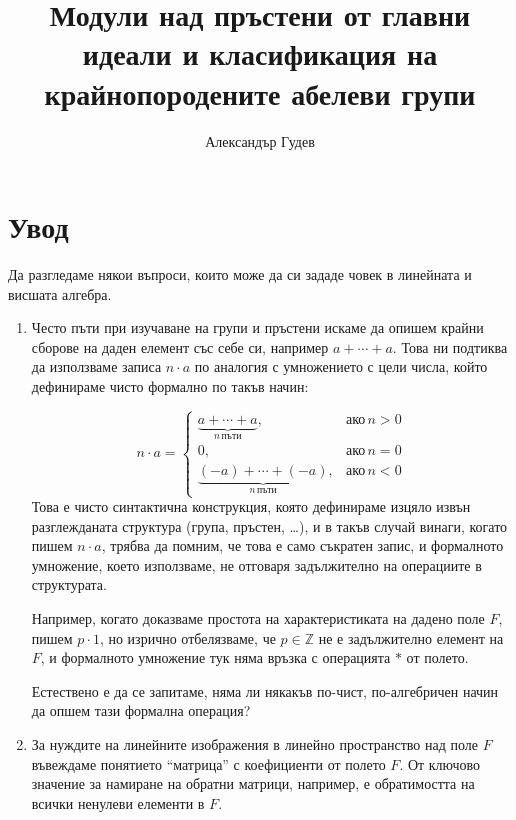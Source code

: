 \documentclass{article}
\title{Модули над пръстени от главни идеали и класификация на крайнопородените абелеви групи}
\author{Александър Гудев}
\date{\vspace{-0.4in}}
\newif\ifusemulticols
\theoremstyle{definition}
\theoremstyle{remark}
\theoremstyle{plain}
\theoremstyle{plain}
\newenvironment{mymulticols}
    { \ifusemulticols \begin{multicols}{2} \fi }
    { \ifusemulticols \end{multicols} \fi }
\newcommand{\Z}{\mathbb{Z}}
\begin{document}
\maketitle

\begin{mymulticols}

\section{Увод}

Да разгледаме някои въпроси, които може да си зададе човек в линейната и висшата алгебра.

\begin{enumerate}
    \item
        Често пъти при изучаване на групи и пръстени искаме да опишем крайни сборове на даден
        елемент със себе си, например $a + \cdots + a$.
        Това ни подтиква да използваме записа $n \cdot a$ по аналогия с умножението с цели числа,
        който дефинираме чисто формално по такъв начин:

\[
n \cdot a =
\begin{cases}
    \underbrace{a + \cdots + a}_{n\,\text{пъти}}   ,& \text{ако} \, n > 0\\
    0                                               ,& \text{ако} \, n = 0\\
    \underbrace{(- a) + \cdots +(- a)}_{n\,\text{пъти}} ,& \text{ако} \, n < 0
\end{cases}
\]
        Това е чисто синтактична конструкция, която дефинираме изцяло извън разглежданата структура
        (група, пръстен, \ldots), и в такъв случай винаги, когато пишем $n \cdot a$, трябва да
        помним, че това е само съкратен запис, и формалното умножение, което използваме, не отговаря
        задължително на операциите в структурата.

        Например, когато доказваме простота на характеристиката на дадено поле $F$, пишем $p \cdot
        1$, но изрично отбелязваме, че $p \in \Z$ не е задължително елемент на $F$, и
        формалното умножение тук няма връзка с операцията $*$ от полето.

        Естествено е да се запитаме, няма ли някакъв по-чист, по-алгебричен начин да опшем тази
        формална операция?

    \item
        За нуждите на линейните изображения в линейно пространство над поле $F$ въвеждаме понятието
        ``матрица'' с коефициенти от полето $F$. От ключово значение за намиране на обратни матрици,
        например, е обратимостта на всички ненулеви елементи в $F$.


\end{enumerate}
\end{mymulticols}
\end{document}
